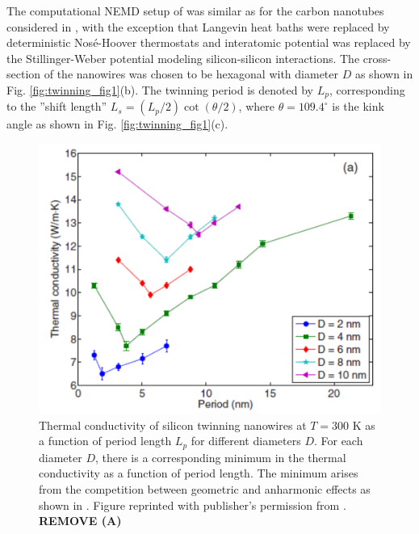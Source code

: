 

The computational NEMD setup of  was similar as for the carbon nanotubes considered in , with the exception that Langevin heat baths were replaced by deterministic Nos\'e-Hoover thermostats \cite{nose84} and interatomic potential was replaced by the Stillinger-Weber potential \cite{stillinger85} modeling silicon-silicon interactions. The cross-section of the nanowires was chosen to be hexagonal with diameter $D$ as shown in Fig. \ref{fig:twinning_fig1}(b). The twinning period is denoted by $L_p$, corresponding to the ''shift length'' $L_s=(L_p/2)\cot(\theta/2)$, where $\theta=109.4^{\circ}$ is the kink angle as shown in Fig. \ref{fig:twinning_fig1}(c). %


\begin{figure}[tb]
 \begin{center}
  \includegraphics[width=.89\columnwidth]{pics/twinning_fig2a.pdf} 
  \caption{Thermal conductivity of silicon twinning nanowires at $T=300$ K as a function of period length $L_p$ for different diameters $D$. For each diameter $D$, there is a corresponding minimum in the thermal conductivity as a function of period length. The minimum arises from the competition between geometric and anharmonic effects as shown in . Figure reprinted with publisher's permission from . \textbf{REMOVE (A)}}  
\label{fig:twinning_fig2}
 \end{center}
\end{figure}

